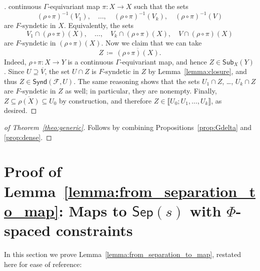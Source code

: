 \documentclass[11pt,reqno,psamsfonts]{amsart}
\theoremstyle{bfnote}
\theoremstyle{definition}
\theoremstyle{remark}
\newcommand{\0}{\varnothing}
\newcommand{\defeq}{\coloneqq}
\newcommand{\G}{\Gamma}
\newcommand{\Sub}{\mathsf{Sub}}
\newcommand{\sr}{amply syndetic\xspace}
\newcommand{\Sep}{\mathsf{Sep}}
\newcommand{\Synd}{\mathsf{Synd}}
\numberwithin{equation}{section}
\newenvironment{scproof}[1][]{\begin{proof}[\textsc{\upshape{Proof}}#1]}{\end{proof}}
\begin{document}
\begin{scproof}
        continuous $\G$-equivariant map $\pi \colon X \to X$ such that the sets
        \[
            (\rho \circ \pi)^{-1}(V_1), \quad \ldots, \quad (\rho \circ \pi)^{-1}(V_k), \quad (\rho \circ \pi)^{-1}(V)
        \]
        are $F$-syndetic in $X$. Equivalently, the sets
        \[
            V_1 \cap (\rho \circ \pi)(X), \quad \ldots, \quad V_k \cap (\rho \circ \pi)(X), \quad V \cap (\rho \circ \pi)(X)
        \]
        are $F$-syndetic in $(\rho \circ \pi)(X)$. %
        Now we claim that we can take %
        \[
            Z \,\defeq\, \overline{(\rho \circ \pi)(X)}. %
        \]
        Indeed, $\rho \circ \pi \colon X \to Y$ is a continuous $\G$-equivariant map, and hence $Z \in \Sub_X(Y)$. %
        Since $U \supseteq \overline{V}$, the set $U \cap Z$ is $F$-syndetic in $Z$ by Lemma~\ref{lemma:closure}, and thus $Z \in \Synd(\mathcal{F},U)$. The same reasoning shows that the sets $U_1 \cap Z$, \ldots, $U_k \cap Z$ are $F$-syndetic in $Z$ as well; in particular, they are nonempty.  Finally, $Z \subseteq \overline{\rho(X)} \subseteq U_0$ by construction, and therefore $Z \in \llbracket U_0; U_1, \ldots, U_k\rrbracket$, as desired.
    \end{scproof}

    \begin{scproof}[ of Theorem~\ref{theo:generic}]
        Follows by combining Propositions~\ref{prop:Gdelta} and \ref{prop:dense}.
    \end{scproof}

    \section{Proof of Lemma~\ref{lemma:from_separation_to_map}: Maps to $\Sep(s)$ with $\Phi$-spaced constraints}\label{sec:spaced}

    In this section we prove Lemma~\ref{lemma:from_separation_to_map}, restated here for ease of reference:
\end{document}
